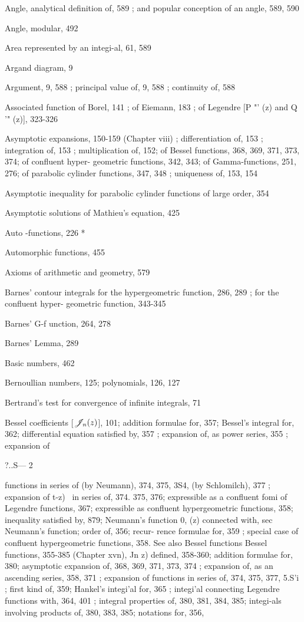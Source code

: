 Angle, analytical definition of, 589 ; and popular conception of an angle, 589, 590

Angle, modular, 492

Area represented by an integi-al, 61, 589

Argand diagram, 9

Argument, 9, 588 ; principal value of, 9, 588 ; continuity of, 588

Associated function of Borel, 141 ; of Eiemann, 183 ; of Legendre [P "' (z) and Q '" (z)], 323-326

Asymptotic expansions, 150-159 (Chapter viii) ; differentiation of, 153 ; integration of, 153 ;
multiplication of, 152; of Bessel functions, 368, 369, 371, 373, 374; of confluent hyper-
geometric functions, 342, 343; of Gamma-functions, 251, 276; of parabolic cylinder functions,
347, 348 ; uniqueness of, 153, 154

Asymptotic inequality for parabolic cylinder functions of large order, 354

Asymptotic solutions of Mathieu's equation, 425

Auto -functions, 226 *

Automorphic functions, 455

Axioms of arithmetic and geometry, 579

Barnes' contour integrals for the hypergeometric function, 286, 289 ; for the confluent hyper-
geometric function, 343-345

Barnes' G-f unction, 264, 278

Barnes' Lemma, 289

Basic numbers, 462

Bernoullian numbers, 125; polynomials, 126, 127

Bertrand's test for convergence of infinite integrals, 71

Bessel coefficients [$\mathscr{J}_{n}(z)$], 101; addition formulae for, 357; Bessel's integral for, 362;
differential equation satisfied by, 357 ; expansion of, as power series, 355 ; expansion of

?..S— 2

%
%
functions in series of (by Neumann), 374, 375, 3S4, (by Schlomilch), 377 ; expansion of
 t-z)~  in series of, 374. 375, 376; expressible as a confluent fomi of Legendre functions,
367; expressible as confluent hypergeometric functions, 358; inequality satisfied by, 879;
Neumann's function 0, (z) connected with, sec Neumann's function; order of, 356; recur-
rence formulae for, 359 ; special case of confluent hypergeometric functions, 358. See also
Bessel functions
Bessel functions, 355-385 (Chapter xvn), Jn z) defined, 358-360; addition formulae for, 380;
asymptotic expansion of, 368, 369, 371, 373, 374 ; expansion of, as an ascending series, 358,
371 ; expansion of functions in series of, 374, 375, 377, 5.S'i ; first kind of, 359; Hankel's
integi'al for, 365 ; integi'al connecting Legendre functions with, 364, 401 ; integral properties
of, 380, 381, 384, 385; integi-als involving products of, 380, 383, 385; notations for, 356,

